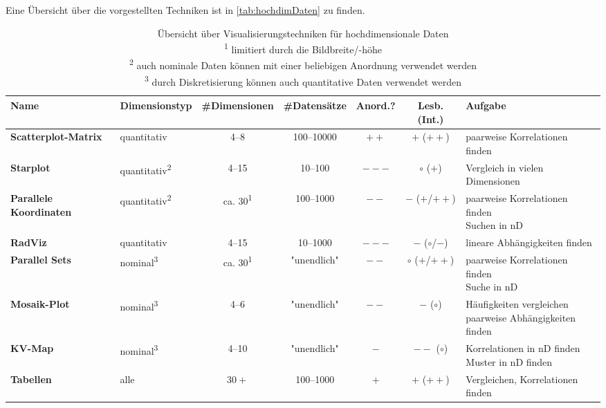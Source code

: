 		Eine Übersicht über die vorgestellten Techniken ist in \autoref{tab:hochdimDaten} zu finden.

		\begin{table}
			\centering
			\begin{tabular}{l|lccccl}
				\toprule
				\textbf{Name} & \textbf{Dimensionstyp} & \textbf{\#Dimensionen} & \textbf{\#Datensätze} & \textbf{Anord.?} & \textbf{Lesb. (Int.)} & \textbf{Aufgabe} \\ \midrule
				\textbf{Scatterplot-Matrix} & quantitativ & \numrange{4}{8} & \numrange{100}{10000} & \(++\) & \(+\) (\(++\)) & paarweise Korrelationen finden \\ \midrule
				\textbf{Starplot} & quantitativ\textsuperscript{2} & \numrange{4}{15} & \numrange{10}{100} & \(---\) & \(\circ\) (\(+\)) & Vergleich in vielen Dimensionen \\ \midrule
				\textbf{Parallele Koordinaten} & quantitativ\textsuperscript{2} & ca. \num{30}\textsuperscript{1} & \numrange{100}{1000} & \(--\) & \(-\) (\(+\)/\(++\)) & \multirowcell{2}[][l]{paarweise Korrelationen finden\\Suchen in nD} \\ \midrule
				\textbf{RadViz} & quantitativ & \numrange{4}{15} & \numrange{10}{1000} & \(---\) & \(-\) (\(\circ\)/\(-\)) & lineare Abhängigkeiten finden \\ \midrule
				\textbf{Parallel Sets} & nominal\textsuperscript{3} & ca. \num{30}\textsuperscript{1} & "unendlich" & \(--\) & \(\circ\) (\(+\)/\(++\)) & \multirowcell{2}[][l]{paarweise Korrelationen finden\\Suche in nD} \\ \midrule
				\textbf{Mosaik-Plot} & nominal\textsuperscript{3} & \numrange{4}{6} & "unendlich" & \(--\) & \(-\) (\(\circ\)) & \multirowcell{2}[][l]{Häufigkeiten vergleichen\\paarweise Abhängigkeiten finden} \\ \midrule
				\textbf{KV-Map} & nominal\textsuperscript{3} & \numrange{4}{10} & "unendlich" & \(-\) & \(--\) (\(\circ\)) & \multirowcell{2}[][l]{Korrelationen in nD finden\\Muster in nD finden} \\ \midrule
				\textbf{Tabellen} & alle & \(30+\) & \numrange{100}{1000} & \(+\) & \(+\) (\(++\)) & Vergleichen, Korrelationen finden \\
				\bottomrule
			\end{tabular}
			\caption[Übersicht über Visualisierungstechniken für hochdimensionale Daten]{
				Übersicht über Visualisierungstechniken für hochdimensionale Daten \\
				\textsuperscript{1} limitiert durch die Bildbreite/-höhe \\
				\textsuperscript{2} auch nominale Daten können mit einer beliebigen Anordnung verwendet werden \\
				\textsuperscript{3} durch Diskretisierung können auch quantitative Daten verwendet werden
			}
			\label{tab:hochdimDaten}
		\end{table}

